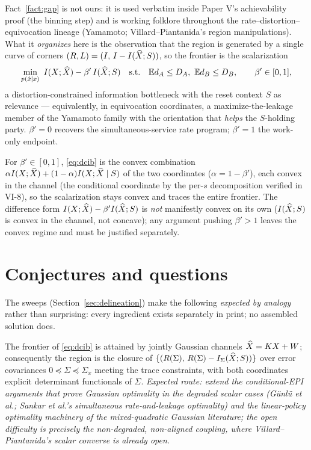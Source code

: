 \documentclass[11pt]{article}
\newcommand{\E}{\mathbb{E}}\newcommand{\tr}{\operatorname{tr}}
\begin{document}
\begin{remark}[attribution]
Fact~\ref{fact:gap} is not ours: it is used verbatim inside Paper V's
achievability proof (the binning step) and is working folklore throughout
the rate--distortion--equivocation lineage (Yamamoto; Villard--Piantanida's
region manipulations). What it \emph{organizes} here is the observation
that the region is generated by a single curve of corners
$(R,L)=(I,\,I-I(\widehat X;S))$, so the frontier is the scalarization
\begin{equation}
\min_{p(\hat x\mid x)}\ I(X;\hX)-\beta'\, I(\hX;S)
\quad\text{s.t.}\quad \E d_A\le D_A,\ \E d_B\le D_B,
\qquad \beta'\in[0,1],
\label{eq:dcib}
\end{equation}
a distortion-constrained information bottleneck with the reset context $S$
as relevance --- equivalently, in equivocation coordinates, a
maximize-the-leakage member of the Yamamoto family with the orientation
that \emph{helps} the $S$-holding party. $\beta'=0$ recovers the
simultaneous-service rate program; $\beta'=1$ the work-only endpoint.
\end{remark}

\begin{remark}\label{rem:convex}
For $\beta'\in[0,1]$, \eqref{eq:dcib} is the convex combination
$\alpha I(X;\widehat X)+(1-\alpha)I(X;\widehat X\mid S)$ of the two coordinates
($\alpha=1-\beta'$), each convex in the channel (the conditional coordinate
by the per-$s$ decomposition verified in VI-8), so the scalarization stays
convex and traces the entire frontier. The difference form
$I(X;\widehat X)-\beta' I(\widehat X;S)$ is \emph{not} manifestly convex on its own
($I(\widehat X;S)$ is convex in the channel, not concave); any argument pushing
$\beta'>1$ leaves the convex regime and must be justified separately.
\end{remark}

\section{Conjectures and questions}
The sweeps (Section~\ref{sec:delineation}) make the following
\emph{expected by analogy} rather than surprising: every ingredient exists
separately in print; no assembled solution does.

\begin{conjecture}\label{conj:gauss}
The frontier of \eqref{eq:dcib} is attained by jointly Gaussian channels
$\widehat X = KX+W$; consequently the region is the closure of
$\{(R(\Sigma),\,R(\Sigma)-I_{\Sigma}(\widehat X;S))\}$ over error covariances
$0\preceq\Sigma\preceq\Sigma_x$ meeting the trace constraints, with both
coordinates explicit determinant functionals of $\Sigma$. \emph{Expected
route: extend the conditional-EPI arguments that prove Gaussian optimality
in the degraded scalar cases (G\"unl\"u et al.; Sankar et al.'s
simultaneous rate-and-leakage optimality) and the linear-policy optimality
machinery of the mixed-quadratic Gaussian literature; the open difficulty
is precisely the non-degraded, non-aligned coupling, where
Villard--Piantanida's scalar converse is already open.}
\end{conjecture}
\end{document}
